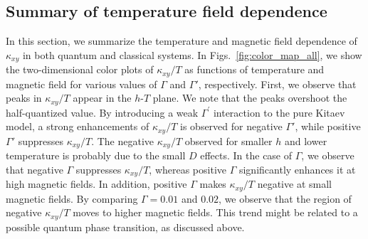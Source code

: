 \documentclass[twocolumn,superscriptaddress,showpacs, longbibliography, aps, prb]{revtex4-2}
\begin{document}

\clearpage
\subsection{Summary of temperature field dependence}
In this section, we summarize the temperature and %
magnetic field 
dependence of $\kappa_{xy}$ in both quantum and classical systems.
In Figs.~\ref{fig:color_map_all},
we %
show the two-dimensional color plots of $\kappa_{xy}/T$ %
as functions of temperature and %
magnetic field for various values of $\Gamma$ and $\Gamma'$, respectively. 
First, we %
observe that %
peaks in $\kappa_{xy}/T$ appear in the $h$-$T$ plane.
We note that the peaks %
overshoot the half-quantized value. 
By introducing a weak $\Gamma^{\prime}$ interaction to the pure Kitaev model, 
a strong enhancements of $\kappa_{xy}/T$ %
is observed for negative $\Gamma'$, while positive $\Gamma'$ suppresses $\kappa_{xy}/T$. 
The negative $\kappa_{xy}/T$ observed for smaller $h$ and lower temperature %
is probably due to the small $D$ effects.
In the case of $\Gamma$,
we %
observe that negative $\Gamma$ suppresses $\kappa_{xy}/T$, 
whereas positive $\Gamma$ %
significantly enhances it %
at high magnetic fields. 
In addition, positive $\Gamma$ %
makes $\kappa_{xy}/T$ negative at small magnetic fields. 
By comparing $\Gamma = 0.01$ and $0.02$, we %
observe that the region of negative $\kappa_{xy}/T$ moves to higher magnetic fields. This trend might be related to a possible quantum phase transition, as discussed above. 
\end{document}
